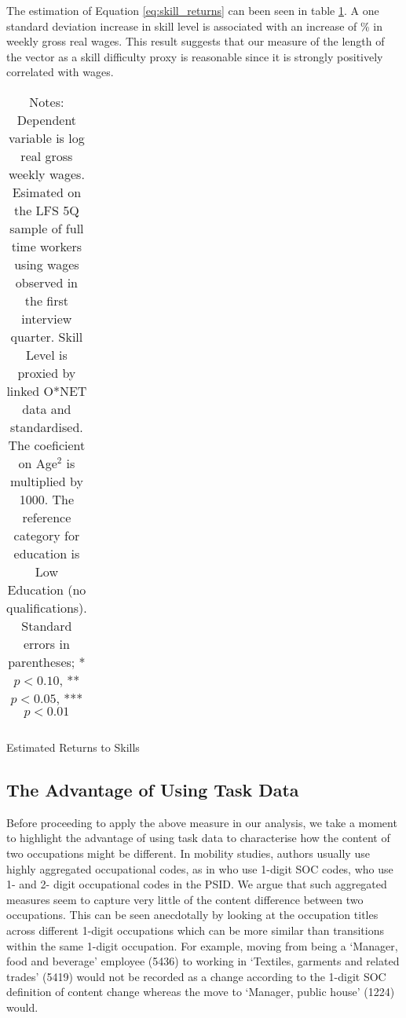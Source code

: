 \documentclass[preprint,12pt,authoryear]{elsarticle}
\begin{document}
\vspace{2mm}

The estimation of Equation \ref{eq:skill_returns} can been seen in table \ref{skill_returns}. A one standard deviation increase in skill level is associated with an increase of \hspace{-1mm}\% in weekly gross real wages. This result suggests that our measure of the length of the vector as a skill difficulty proxy is reasonable since it is strongly positively correlated with wages. 


\begin{table}[t]
	\centering
	\begin{tabular}{l*{1}{c}}
		
	\end{tabular}
	\caption{Estimated Returns to Skills} 
	\caption*{\footnotesize Notes: Dependent variable is log real gross weekly wages. Esimated on the LFS 5Q sample of full time workers using wages observed in the first interview quarter. Skill Level is proxied by linked O*NET data and standardised. The coeficient on Age$^2$ is multiplied by 1000. The reference category for education is Low Education (no qualifications). Standard errors in parentheses;	* \(p<0.10\), ** \(p<0.05\), *** \(p<0.01\)}
	\label{skill_returns}
\end{table}





\subsection{The Advantage of Using Task Data}
\label{sec:advantageTasks}
Before proceeding to apply the above measure in our analysis, we take a moment to highlight the advantage of using task data to characterise how the content of two occupations might be different. In mobility studies, authors usually use highly aggregated occupational codes, as in \cite{Carrillo-Tudela2016} who use 1-digit SOC codes, \cite{kambourov2009occupational} who use 1- and 2- digit occupational codes in the PSID. We argue that such aggregated measures seem to capture very little of the content difference between two occupations. This can be seen anecdotally by looking at the occupation titles across different 1-digit occupations which can be more similar than transitions within the same 1-digit occupation. For example, moving from being a `Manager, food and beverage' employee (5436) to working in `Textiles, garments and related trades' (5419) would not be recorded as a change according to the 1-digit SOC definition of content change whereas the move to `Manager, public house' (1224) would. 
\end{document}
